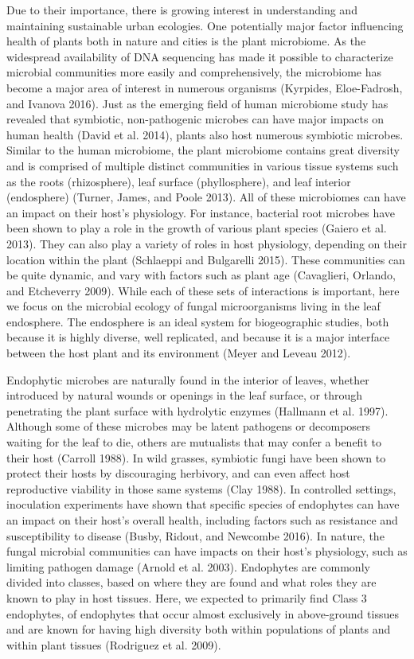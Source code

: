 \documentclass[fleqn,10pt,lineno]{wlpeerj} %
\begin{document}
Due to their importance, there is growing interest in understanding and maintaining sustainable urban ecologies. One potentially major factor influencing health of plants both in nature and cities is the plant microbiome. As the widespread availability of DNA sequencing has made it possible to characterize microbial communities more easily and comprehensively, the microbiome has become a major area of interest in numerous organisms (Kyrpides, Eloe-Fadrosh, and Ivanova 2016). Just as the emerging field of human microbiome study has revealed that symbiotic, non-pathogenic microbes can have major impacts on human health (David et al. 2014), plants also host numerous symbiotic microbes. Similar to the human microbiome, the plant microbiome contains great diversity and is comprised of multiple distinct communities in various tissue systems such as the roots (rhizosphere), leaf surface (phyllosphere), and leaf interior (endosphere) (Turner, James, and Poole 2013). All of these microbiomes can have an impact on their host's physiology. For instance, bacterial root microbes have been shown to play a role in the growth of various plant species (Gaiero et al. 2013). They can also play a variety of roles in host physiology, depending on their location within the plant (Schlaeppi and Bulgarelli 2015). These communities can be quite dynamic, and vary with factors such as plant age (Cavaglieri, Orlando, and Etcheverry 2009). While each of these sets of interactions is important, here we focus on the microbial ecology of fungal microorganisms living in the leaf endosphere. The endosphere is an ideal system for biogeographic studies, both because it is highly diverse, well replicated, and because it is a major interface between the host plant and its environment (Meyer and Leveau 2012).

Endophytic microbes are naturally found in the interior of leaves, whether introduced by natural wounds or openings in the leaf surface, or through penetrating the plant surface with hydrolytic enzymes (Hallmann et al. 1997). Although some of these microbes may be latent pathogens or decomposers waiting for the leaf to die, others are mutualists that may confer a benefit to their host (Carroll 1988). In wild grasses, symbiotic fungi have been shown to protect their hosts by discouraging herbivory, and can even affect host reproductive viability in those same systems (Clay 1988). In controlled settings, inoculation experiments have shown that specific species of endophytes can have an impact on their host's overall health, including factors such as resistance and susceptibility to disease (Busby, Ridout, and Newcombe 2016). In nature, the fungal microbial communities can have impacts on their host's physiology, such as limiting pathogen damage (Arnold et al. 2003). Endophytes are commonly divided into classes, based on where they are found and what roles they are known to play in host tissues. Here, we expected to primarily find Class 3 endophytes, of endophytes that occur almost exclusively in above-ground tissues and are known for having high diversity both within populations of plants and within plant tissues (Rodriguez et al. 2009).
\end{document}
